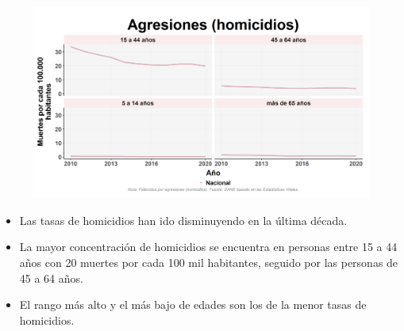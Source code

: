     \begin{figure}[H]
        \caption[Agresiones (homicidios) por rango de edad ]{\label{homicid_edad_trend} }
        \begin{center}
        \includegraphics[width=\textwidth,keepaspectratio]{img/var_287_trend.png}
        \end{center}
    \end{figure}
            \begin{itemize}
                \item Las tasas de homicidios han ido disminuyendo en la última década.
                \item La mayor concentración de homicidios se encuentra en personas entre 15 a 44 años con 20 muertes por cada 100 mil habitantes, seguido por las personas de 45 a 64 años.
                \item El rango más alto y el más bajo de edades son los de la menor tasas de homicidios.
                \end{itemize}

